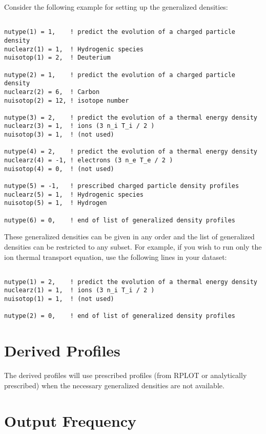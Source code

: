 Consider the following example for setting up the generalized densities:
\begin{verbatim}

nutype(1) = 1,    ! predict the evolution of a charged particle density
nuclearz(1) = 1,  ! Hydrogenic species
nuisotop(1) = 2,  ! Deuterium

nutype(2) = 1,    ! predict the evolution of a charged particle density
nuclearz(2) = 6,  ! Carbon
nuisotop(2) = 12, ! isotope number

nutype(3) = 2,    ! predict the evolution of a thermal energy density
nuclearz(3) = 1,  ! ions (3 n_i T_i / 2 )
nuisotop(3) = 1,  ! (not used)

nutype(4) = 2,    ! predict the evolution of a thermal energy density
nuclearz(4) = -1, ! electrons (3 n_e T_e / 2 )
nuisotop(4) = 0,  ! (not used)

nutype(5) = -1,   ! prescribed charged particle density profiles  
nuclearz(5) = 1,  ! Hydrogenic species
nuisotop(5) = 1,  ! Hydrogen

nutype(6) = 0,    ! end of list of generalized density profiles

\end{verbatim}

These generalized densities can be given in any order and
the list of generalized densities can be restricted to any subset.
For example, if you wish to run only the ion thermal transport
equation, use the following lines in your dataset:
\begin{verbatim}

nutype(1) = 2,    ! predict the evolution of a thermal energy density
nuclearz(1) = 1,  ! ions (3 n_i T_i / 2 )
nuisotop(1) = 1,  ! (not used)

nutype(2) = 0,    ! end of list of generalized density profiles

\end{verbatim}






\section{Derived Profiles}

The derived profiles will use prescribed profiles (from RPLOT or
analytically prescribed) when the necessary generalized densities are
not available. 


\section{Output Frequency}

